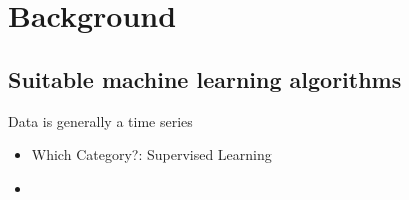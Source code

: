 \chapter{Background}\label{sec:data}

\section{Suitable machine learning algorithms}
Data is generally a time series
    \begin{itemize}
        \item Which Category?: Supervised Learning
        \item 
    \end{itemize}

